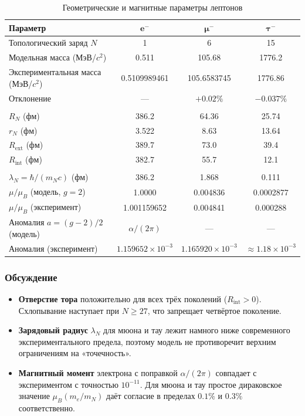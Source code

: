 \documentclass[11pt,a4paper]{article}
\begin{document}
\begin{table}[htbp]
\centering
\caption{Геометрические и магнитные параметры лептонов}
\renewcommand{\arraystretch}{1.3}
\begin{tabular}{lccc}
\toprule
\textbf{Параметр} & $\bm{e^-}$ & $\bm{\mu^-}$ & $\bm{\tau^-}$ \\
\midrule
Топологический заряд $N$ & 1 & 6 & 15 \\
Модельная масса (МэВ/$c^2$) & 0.511 & 105.68 & 1776.2 \\
Экспериментальная масса (МэВ/$c^2$) & 0.5109989461 & 105.6583745 & 1776.86 \\
Отклонение & --- & $+0.02\%$ & $-0.037\%$ \\
\addlinespace
\multicolumn{4}{c}{\textit{Параметры нейтрального керна}} \\
\midrule
$R_N$ (фм) & 386.2 & 64.36 & 25.74 \\
$r_N$ (фм) & 3.522 & 8.63 & 13.64 \\
$R_{\text{ext}}$ (фм) & 389.7 & 73.0 & 39.4 \\
$R_{\text{int}}$ (фм) & 382.7 & 55.7 & 12.1 \\
\addlinespace
\multicolumn{4}{c}{\textit{Зарядовый радиус и магнитный момент}} \\
\midrule
$\lambda_N = \hbar/(m_N c)$ (фм) & 386.2 & 1.868 & 0.111 \\
$\mu/\mu_B$ (модель, $g=2$) & 1.0000 & 0.004836 & 0.0002877 \\
$\mu/\mu_B$ (эксперимент) & 1.001159652 & 0.004841 & 0.000288 \\
Аномалия $a=(g-2)/2$ (модель) & $\alpha/(2\pi)$ & --- & --- \\
Аномалия (эксперимент) & $1.159652\times10^{-3}$ & $1.165920\times10^{-3}$ & $\approx1.18\times10^{-3}$ \\
\bottomrule
\end{tabular}
\label{tab:leptons_final}
\end{table}

\subsubsection{Обсуждение}
\begin{itemize}
\item \textbf{Отверстие тора} положительно для всех трёх поколений ($R_{\text{int}}>0$). Схлопывание наступает при $N\ge27$, что запрещает четвёртое поколение.
\item \textbf{Зарядовый радиус} $\lambda_N$ для мюона и тау лежит намного ниже современного экспериментального предела, поэтому модель не противоречит верхним ограничениям на «точечность».
\item \textbf{Магнитный момент} электрона с поправкой $\alpha/(2\pi)$ совпадает с экспериментом с точностью $10^{-11}$. Для мюона и тау простое дираковское значение $\mu_B(m_e/m_N)$ даёт согласие в пределах $0.1\%$ и $0.3\%$ соответственно.
\end{itemize}
	
\end{document}
